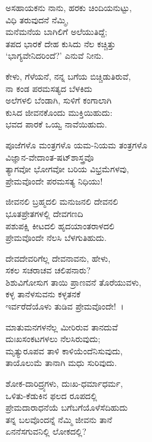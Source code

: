 \begin{myquote}
ಅಸಹಾಯಕನು ನಾನು, ಹರಕು ಚಿಂದಿಯನುಟ್ಟು,\\ವಿಧಿ ತರುವುದನೆ ನೆಮ್ಮಿ,\\ಮನೆಮನೆಯ ಬಾಗಿಲಿಗೆ ಅಲೆಯುತಿದ್ದೆ;\\ತಪದ ಭಾರಕೆ ದೇಹ ಕುಸಿದು ನೆಲ ಕಚ್ಚಿತ್ತು\\‘ಭಾಗ್ಯವೇನಿದರಿಂದೆ?’ ಎನುವೆ ನೀನು.
\end{myquote}

\begin{myquote}
ಕೇಳು, ಗೆಳೆಯನೆ, ನನ್ನ ಬಗೆಯ ಬಿಚ್ಚಿಡುತಿರುವೆ,\\ನಾ ಕಂಡ ಪರಮಸತ್ಯದ ಬೆಳಕಿದು\\ಅಲೆಗಳಲಿ ಬೆಂಡಾಗಿ, ಸುಳಿಗೆ ಕಂಗಾಲಾಗಿ\\ಕುಸಿದ ಜೀವನಕೊಂದು ಮುಕ್ತಿಯಿಹುದು:\\ಭವದ ಪಾರಕೆ ಒಯ್ವ ನಾವೆಯಿಹುದು.
\end{myquote}

\begin{myquote}
ಪೂಜೆಗಳೊ ಮಂತ್ರಗಳೊ ಯಮ-ನಿಯಮ ತಂತ್ರಗಳೊ\\ವಿಜ್ಞಾನ-ವೇದಾಂತ-ಷಟ್‌ಶಾಸ್ತ್ರವೊ\\ತ್ಯಾಗವೋ ಭೋಗವೋ ಬರಿಯ ವಿಭ್ರಮೆಗಳವು,\\ಪ್ರೇಮವೊಂದೇ ಪರಮಸತ್ಯ ನಿಧಿಯು!
\end{myquote}

\begin{myquote}
ಜೀವನಲಿ ಬ್ರಹ್ಮದಲಿ ಮನುಜನಲಿ ದೇವನಲಿ\\ಭೂತಪ್ರೇತಗಳಲ್ಲಿ ದೇವಗಣದಿ\\ಪಶುಪಕ್ಷಿ ಕೀಟದಲಿ ಹೃದಯಾಂತರಾಳದಲಿ\\
 ಪ್ರೇಮವೊಂದೇ ನೆಲಸಿ ಬೆಳಗುತಿಹುದು.
\end{myquote}

\begin{myquote}
ದೇವದೇವರಿಗೆಲ್ಲ ದೇವನಾವನು, ಹೇಳು,\\ಸಕಲ ಸಚರಾಚವ ಚಲಿಪನಾರು?\\ಶಿಶುವಿಗೋಸುಗ ತಾಯಿ ಪ್ರಾಣವನೆ ತೊರೆಯುವಳು,\\ಕಳ್ಳ ತಾನೆಳಸುವನು ಕಳ್ಳತನಕೆ\\ಇರ್ವರೆದೆಯೊಳು ತುಡಿವ ಪ್ರೇಮವೊಂದೇ!~।
\end{myquote}

\begin{myquote}
ಮಾತುಮನಗಳನೆಲ್ಲ ಮೀರಿರುವ ತಾನದುವೆ\\ದುಃಖಸಂಕಟಗಳಲು ನೆಲಸಿರುವುದು;\\ಮೃತ್ಯುರೂಪವ ತಾಳಿ ಕಾಳಿಯೆಂದೆನಿಸುವುದು,\\ತಾಯೊಲುಮೆ ತಾನಾಗಿ ಮಧು ಸುರಿವುದು.
\end{myquote}

\begin{myquote}
ಶೋಕ-ದಾರಿದ್ರ್ಯಗಳು, ದುಃಖ-ಧರ್ಮಾಧರ್ಮ,\\ಒಳಿತು-ಕೆಡುಕಿನ ಫಲದ ರೂಪದಲ್ಲಿ\\ಪ್ರೇಮದಾರಾಧನೆಯೆ ಬಗೆಬಗೆಯೊಳೆಸೆದಿಹುದು\\ತನ್ನ ಬಲವೊಂದನ್ನೆ ನೆಮ್ಮಿ ಜೀವನು ತಾನೆ\\ಏನನೆಸಗುವನಿಲ್ಲಿ ಲೋಕದಲ್ಲಿ?
\end{myquote}

